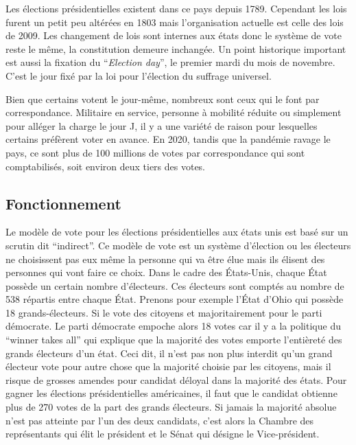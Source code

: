 \documentclass[12pt,a4paper]{report}
\begin{document}
Les élections présidentielles existent dans ce pays depuis 1789.
Cependant les lois furent un petit peu altérées en 1803 mais l'organisation actuelle est celle des lois de 2009.
Les changement de lois sont internes aux états donc le système de vote reste le même, la constitution demeure inchangée.
Un point historique important est aussi la fixation du “\textit{Election day}”, le premier mardi du mois de novembre.
C’est le jour fixé par la loi pour l'élection du suffrage universel.

Bien que certains votent le jour-même, nombreux sont ceux qui le font par correspondance.
Militaire en service, personne à mobilité réduite ou simplement pour alléger la charge le jour J, il y a une variété de raison pour lesquelles certains préfèrent voter en avance.
En 2020, tandis que la pandémie ravage le pays, ce sont plus de 100 millions de votes par correspondance qui sont comptabilisés, soit environ deux tiers des votes. \nocite{electproj:electproj}

\subsection{Fonctionnement} %
Le modèle de vote pour les élections présidentielles aux états unis est basé sur un scrutin dit “indirect”.
Ce modèle de vote est un système d'élection ou les électeurs ne choisissent pas eux même la personne qui va être élue mais ils élisent des personnes qui vont faire ce choix.
Dans le cadre des États-Unis, chaque État possède un certain nombre d'électeurs.
Ces électeurs sont comptés au nombre de 538 répartis entre chaque État.
Prenons pour exemple l'État d'Ohio qui possède 18 grands-électeurs.
Si le vote des citoyens et majoritairement pour le parti démocrate.
Le parti démocrate empoche alors 18 votes car il y a la politique du “winner takes all” qui explique que la majorité des votes emporte l'entièreté des grands électeurs d’un état.
Ceci dit, il n’est pas non plus interdit qu’un grand électeur vote pour autre chose que la majorité choisie par les citoyens, mais il risque de grosses amendes pour candidat déloyal dans la majorité des états.
Pour gagner les élections présidentielles américaines, il faut que le candidat obtienne plus de 270 votes de la part des grands électeurs.
Si jamais la majorité absolue n’est pas atteinte par l’un des deux candidats, c’est alors la Chambre des représentants qui élit le président et le Sénat qui désigne le Vice-président.
\nocite{wiki:electday}
\nocite{wiki:elecus}
\nocite{wiki:eleccoll}
\end{document}
